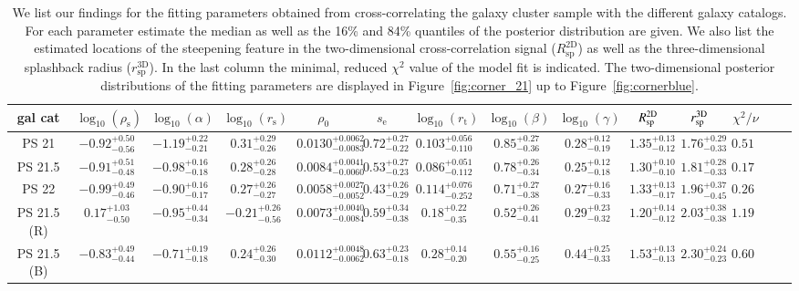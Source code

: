 \documentclass[iop, apjl, twocolappendix, numberedappendix]{emulateapj}
\begin{document}
\begin{table}
    \centering
    \caption{We list our findings for the fitting parameters obtained from cross-correlating the galaxy cluster sample with the different galaxy catalogs. For each parameter estimate the median as well as the 16\% and 84\% quantiles of the posterior distribution are given. We also list the estimated locations of the steepening feature in the two-dimensional cross-correlation signal ($R_{\mathrm{sp}}^{\mathrm{2D}}$) as well as the three-dimensional splashback radius ($r_{\mathrm{sp}}^{\mathrm{3D}}$). In the last column the minimal, reduced $\chi^2$ value of the model fit is indicated. The two-dimensional posterior distributions of the fitting parameters are displayed in 
Figure~\ref{fig:corner_21} up to Figure~\ref{fig:cornerblue}.}
    \label{tab:fit_parameters}
    \begin{tabular}{cccccccccccccc}
    \hline 
gal cat & $\log_{10}(\rho_{\mathrm{s}})$ & $\log_{10}(\alpha)$ & $\log_{10}(r_{\mathrm{s}})$ & $\rho_{\mathrm{0}}$ & $s_{\mathrm{e}}$ & $\log_{10}(r_{\mathrm{t}})$ & $\log_{10}(\beta)$ & $\log_{10}(\gamma)$ & $R_{\rm sp}^{\rm 2D}$& $r_{\rm sp}^{\rm 3D}$& $\chi^2/\nu$ \\
\hline 
\hline 
PS 21 & $-0.92_{-0.56}^{+0.50}$ & $-1.19_{-0.21}^{+0.22}$ & $0.31_{-0.26}^{+0.29}$ & $0.0130_{-0.0083}^{+0.0062}$ & $0.72_{-0.22}^{+0.27}$ & $0.103_{-0.110}^{+0.056}$ & $0.85_{-0.36}^{+0.27}$ & $0.28_{-0.19}^{+0.12}$ & $1.35_{-0.12}^{+0.13}$ & $1.76_{-0.33}^{+0.29}$ & $0.511$ \\
\hline
PS 21.5 & $-0.91_{-0.48}^{+0.51}$ & $-0.98_{-0.18}^{+0.16}$ & $0.28_{-0.28}^{+0.26}$ & $0.0084_{-0.0060}^{+0.0041}$ & $0.53_{-0.23}^{+0.27}$ & $0.086_{-0.112}^{+0.051}$ & $0.78_{-0.34}^{+0.26}$ & $0.25_{-0.18}^{+0.12}$ & $1.30_{-0.10}^{+0.10}$ & $1.81_{-0.33}^{+0.28}$ & $0.178$ \\
\hline
PS 22 & $-0.99_{-0.46}^{+0.49}$ & $-0.90_{-0.17}^{+0.16}$ & $0.27_{-0.27}^{+0.26}$ & $0.0058_{-0.0052}^{+0.0027}$ & $0.43_{-0.29}^{+0.26}$ & $0.114_{-0.252}^{+0.076}$ & $0.71_{-0.38}^{+0.27}$ & $0.27_{-0.33}^{+0.16}$ & $1.33_{-0.17}^{+0.13}$ & $1.96_{-0.45}^{+0.37}$ & $0.264$ \\
\hline 
PS 21.5 (R) & $0.17_{-0.50}^{+1.03}$ & $-0.95_{-0.34}^{+0.44}$ & $-0.21_{-0.56}^{+0.26}$ & $0.0073_{-0.0084}^{+0.0040}$ & $0.59_{-0.38}^{+0.34}$ & $0.18_{-0.35}^{+0.22}$ & $0.52_{-0.41}^{+0.26}$ & $0.29_{-0.32}^{+0.23}$ & $1.20_{-0.12}^{+0.14}$ & $2.03_{-0.38}^{+0.38}$ & $1.194$ \\
\hline
PS 21.5 (B) & $-0.83_{-0.44}^{+0.49}$ & $-0.71_{-0.18}^{+0.19}$ & $0.24_{-0.30}^{+0.26}$ & $0.0112_{-0.0062}^{+0.0048}$ & $0.63_{-0.18}^{+0.23}$ & $0.28_{-0.20}^{+0.14}$ & $0.55_{-0.25}^{+0.16}$ & $0.44_{-0.33}^{+0.25}$ & $1.53_{-0.13}^{+0.13}$ & $2.30_{-0.23}^{+0.24}$ & $0.603$ \\
\hline
    \end{tabular} 
\end{table}
\end{document}

